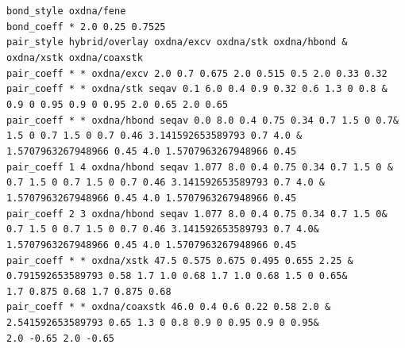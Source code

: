 \documentclass[12pt,onecolumn]{article}
\begin{document}
\smallskip
\texttt{bond\_style oxdna/fene\\
bond\_coeff * 2.0 0.25 0.7525\\
pair\_style hybrid/overlay oxdna/excv oxdna/stk oxdna/hbond \&\\
\hspace*{0.75cm}oxdna/xstk oxdna/coaxstk\\
pair\_coeff * * oxdna/excv   2.0 0.7 0.675 2.0 0.515 0.5 2.0 0.33 0.32\\
pair\_coeff * * oxdna/stk    seqav 0.1 6.0 0.4 0.9 0.32 0.6 1.3 0 0.8 \&\\
\hspace*{0.75cm}0.9 0 0.95 0.9 0 0.95 2.0 0.65 2.0 0.65\\
pair\_coeff * * oxdna/hbond  seqav 0.0 8.0 0.4 0.75 0.34 0.7 1.5 0 0.7\&\\
\hspace*{0.75cm}1.5 0 0.7 1.5 0 0.7 0.46 3.141592653589793 0.7 4.0 \&\\
\hspace*{0.75cm}1.5707963267948966 0.45 4.0 1.5707963267948966 0.45\\
pair\_coeff 1 4 oxdna/hbond  seqav 1.077 8.0 0.4 0.75 0.34 0.7 1.5 0 \&\\
\hspace*{0.75cm}0.7 1.5 0 0.7 1.5 0 0.7 0.46 3.141592653589793 0.7 4.0 \&\\
\hspace*{0.75cm}1.5707963267948966 0.45 4.0 1.5707963267948966 0.45\\
pair\_coeff 2 3 oxdna/hbond  seqav 1.077 8.0 0.4 0.75 0.34 0.7 1.5 0\&\\
\hspace*{0.75cm}0.7 1.5 0 0.7 1.5 0 0.7 0.46 3.141592653589793 0.7 4.0\&\\
\hspace*{0.75cm}1.5707963267948966 0.45 4.0 1.5707963267948966 0.45\\
pair\_coeff * * oxdna/xstk   47.5 0.575 0.675 0.495 0.655 2.25 \&\\
\hspace*{0.75cm}0.791592653589793 0.58 1.7 1.0 0.68 1.7 1.0 0.68 1.5 0 0.65\&\\
\hspace*{0.75cm}1.7 0.875 0.68 1.7 0.875 0.68\\
pair\_coeff * * oxdna/coaxstk 46.0 0.4 0.6 0.22 0.58 2.0 \&\\
\hspace*{0.75cm}2.541592653589793 0.65 1.3 0 0.8 0.9 0 0.95 0.9 0 0.95\&\\
\hspace*{0.75cm}2.0 -0.65 2.0 -0.65\\
}
\smallskip
\end{document}
